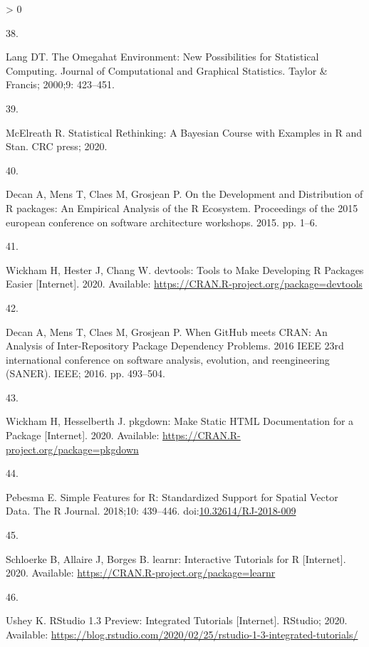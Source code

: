 \documentclass[10pt,letterpaper]{article}
\newlength{\csllabelwidth}
\newlength{\cslhangindent}
\newenvironment{CSLReferences}[3] %
 {%
  \setlength{\parindent}{0pt}
  \ifodd #1 \everypar{\setlength{\hangindent}{\cslhangindent}}\ignorespaces\fi
  \ifnum #2 > 0
  \setlength{\parskip}{#2\baselineskip}
  \fi
 }%
 {}
\newcommand{\CSLLeftMargin}[1]{\parbox[t]{\csllabelwidth}{#1}}
\newcommand{\CSLRightInline}[1]{\parbox[t]{\linewidth - \csllabelwidth}{#1}}
\begin{document}
\begin{CSLReferences}{0}{0}
\leavevmode\hypertarget{ref-lang2000}{}%
\CSLLeftMargin{38. }
\CSLRightInline{Lang DT. {The Omegahat Environment: New Possibilities
for Statistical Computing}. Journal of Computational and Graphical
Statistics. Taylor \& Francis; 2000;9: 423--451. }

\leavevmode\hypertarget{ref-mcelreath2020}{}%
\CSLLeftMargin{39. }
\CSLRightInline{McElreath R. {Statistical Rethinking: A Bayesian Course
with Examples in R and Stan}. CRC press; 2020. }

\leavevmode\hypertarget{ref-decan2015}{}%
\CSLLeftMargin{40. }
\CSLRightInline{Decan A, Mens T, Claes M, Grosjean P. {On the
Development and Distribution of R packages: An Empirical Analysis of the
R Ecosystem}. Proceedings of the 2015 european conference on software
architecture workshops. 2015. pp. 1--6. }

\leavevmode\hypertarget{ref-devtools}{}%
\CSLLeftMargin{41. }
\CSLRightInline{Wickham H, Hester J, Chang W. {devtools: Tools to Make
Developing R Packages Easier} {[}Internet{]}. 2020. Available:
\url{https://CRAN.R-project.org/package=devtools}}

\leavevmode\hypertarget{ref-decan2016}{}%
\CSLLeftMargin{42. }
\CSLRightInline{Decan A, Mens T, Claes M, Grosjean P. {When GitHub meets
CRAN: An Analysis of Inter-Repository Package Dependency Problems}. 2016
IEEE 23rd international conference on software analysis, evolution, and
reengineering (SANER). IEEE; 2016. pp. 493--504. }

\leavevmode\hypertarget{ref-pkgdown}{}%
\CSLLeftMargin{43. }
\CSLRightInline{Wickham H, Hesselberth J. {pkgdown: Make Static HTML
Documentation for a Package} {[}Internet{]}. 2020. Available:
\url{https://CRAN.R-project.org/package=pkgdown}}

\leavevmode\hypertarget{ref-sf}{}%
\CSLLeftMargin{44. }
\CSLRightInline{Pebesma E. {Simple Features for R: Standardized Support
for Spatial Vector Data}. {The R Journal}. 2018;10: 439--446.
doi:\href{https://doi.org/10.32614/RJ-2018-009}{10.32614/RJ-2018-009}}

\leavevmode\hypertarget{ref-learnr}{}%
\CSLLeftMargin{45. }
\CSLRightInline{Schloerke B, Allaire J, Borges B. {learnr: Interactive
Tutorials for R} {[}Internet{]}. 2020. Available:
\url{https://CRAN.R-project.org/package=learnr}}

\leavevmode\hypertarget{ref-ushey2020}{}%
\CSLLeftMargin{46. }
\CSLRightInline{Ushey K. {RStudio 1.3 Preview: Integrated Tutorials}
{[}Internet{]}. RStudio; 2020. Available:
\url{https://blog.rstudio.com/2020/02/25/rstudio-1-3-integrated-tutorials/}}


\end{CSLReferences}
\end{document}
